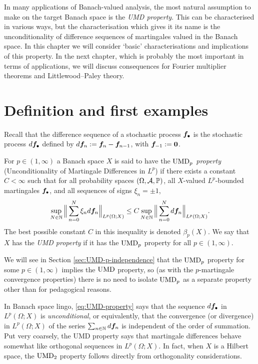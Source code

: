 In many applications of Banach-valued analysis, the most natural assumption to make on the target Banach space is the \emph{UMD property}.
This can be characterised in various ways, but the characterisation which gives it its name is the unconditionality of difference sequences of martingales valued in the Banach space.
In this chapter we will consider `basic' characterisations and implications of this property.
In the next chapter, which is probably the most important in terms of applications, we will discuss consequences for Fourier multiplier theorems and Littlewood--Paley theory.

\section{Definition and first examples}

Recall that the difference sequence of a stochastic process $\bm{f}_{\bullet}$ is the stochastic process $d\bm{f}_{\bullet}$ defined by $d\bm{f}_{n} := \bm{f}_{n} - \bm{f}_{n-1}$, with $\bm{f}_{-1} := \bm{0}$.

\begin{defn}
  For $p \in (1,\infty)$ a Banach space $X$ is said to have the \emph{$\mathrm{UMD}_{p}$ property} (Unconditionality of Martingale Differences in $L^p$) if there exists a constant $C < \infty$ such that for all probability spaces $(\Omega,\mathcal{A},\mathbb{P})$, all $X$-valued $L^p$-bounded martingales $\bm{f}_{\bullet}$, and all sequences of signs $\xi_n = \pm 1$,
  \begin{equation}\label{eq:UMD-property}
    \sup_{N \in \mathbb{N}} \Big\| \sum_{n=0}^{N} \xi_{n} d\bm{f}_{n} \Big\|_{L^p(\Omega;X)} \leq C \sup_{N \in \mathbb{N}} \Big\| \sum_{n=0}^{N} d\bm{f}_{n}\Big\|_{L^p(\Omega;X)}.
  \end{equation}
  The best possible constant $C$ in this inequality is denoted $\beta_{p}(X)$.
  We say that $X$ has the \emph{UMD property} if it has the $\mathrm{UMD}_{p}$ property for all $p \in (1,\infty)$.
\end{defn}

\begin{rmk}
  We will see in Section \ref{sec:UMD-p-independence} that the $\mathrm{UMD}_{p}$ property for some $p \in (1,\infty)$ implies the $\mathrm{UMD}$ property, so (as with the $p$-martingale convergence properties) there is no need to isolate $\mathrm{UMD}_{p}$ as a separate property other than for pedagogical reasons.
\end{rmk}

In Banach space lingo, \eqref{eq:UMD-property} says that the sequence $d\bm{f}_\bullet$ in $L^p(\Omega;X)$ is \emph{unconditional}, or equivalently, that the convergence (or divergence) in $L^p(\Omega;X)$ of the series $\sum_{n \in \mathbb{N}} d\bm{f}_n$ is independent of the order of summation.
Put very coarsely, the UMD property says that martingale differences behave somewhat like orthogonal sequences in $L^p(\Omega;X)$.
In fact, when $X$ is a Hilbert space, the $\mathrm{UMD}_{2}$ property follows directly from orthogonality considerations.

